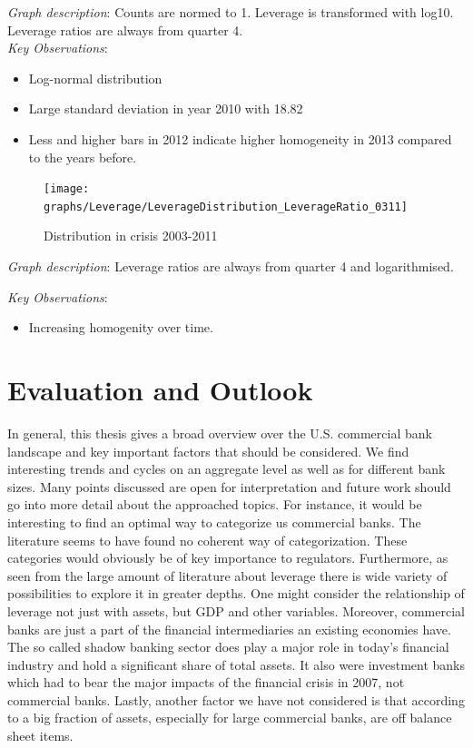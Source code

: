 \documentclass[12pt, a4paper]{article} %
\begin{document}
\noindent \textit{Graph description}: Counts are normed to 1. Leverage is transformed with log10. Leverage ratios are always from quarter 4.
\\

\noindent \textit{Key Observations}:
\begin{itemize}
\item Log-normal distribution
\item Large standard deviation in year 2010 with 18.82
\item Less and higher bars in 2012 indicate higher homogeneity in 2013 compared to the years before.
\end{itemize}

\pagebreak


\begin{figure}[hbtp]
\centering
\caption{Distribution in crisis 2003-2011}
\texttt{[image: graphs/Leverage/LeverageDistribution\_LeverageRatio\_0311]}
\end{figure}

\noindent \textit{Graph description}: Leverage ratios are always from quarter 4 and  logarithmised.

\noindent \textit{Key Observations}:
\begin{itemize}
\item Increasing homogenity over time.
\end{itemize}

\fi

\newpage
\section{Evaluation and Outlook}

In general, this thesis gives a broad overview over the U.S. commercial bank landscape and key important factors that should be considered. We find interesting trends and cycles on an aggregate level as well as for different bank sizes. Many points discussed are open for interpretation and future work should go into more detail about the approached topics. For instance, it would be interesting to find an optimal way to categorize us commercial banks. The literature seems to have found no coherent way of categorization. These categories would obviously be of key importance to regulators. Furthermore, as seen from the large amount of literature about leverage there is wide variety of possibilities to explore it in greater depths. One might consider the relationship of leverage not just with assets, but GDP and other variables. Moreover, commercial banks are just a part of the financial intermediaries an existing economies have. The so called shadow banking sector does play a major role in today's financial industry and hold a significant share of total assets. It also were investment banks which had to bear the major impacts of the financial crisis in 2007, not commercial banks. Lastly, another factor we have not considered is that according to \citet{Kalemli-OzcanBentSorensenSevcanYesiltas2011} a big fraction of assets, especially for large commercial banks, are off balance sheet items. 
\end{document}
